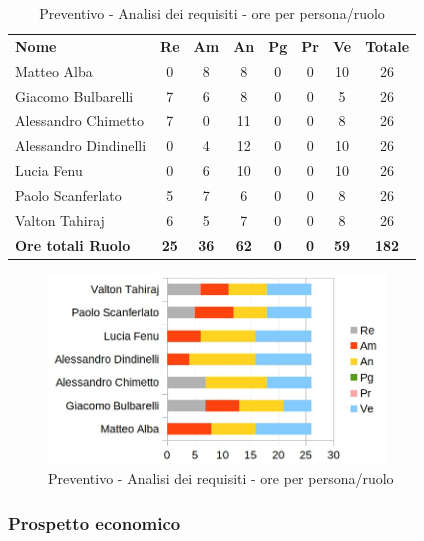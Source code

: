 		\begin{table} [h!]
			\begin{center}
				\begin{tabular} { m{3.5cm} c c c c c c c }
					\rowcolor{lightgray}
					\textbf{Nome} & \textbf{Re} & \textbf{Am} & \textbf{An} & \textbf{Pg} & \textbf{Pr} & \textbf{Ve} & \textbf{Totale} \\
					Matteo Alba &0 & 8 & 8 &0 & 0& 10 & 26\\
					Giacomo Bulbarelli & 7 & 6 & 8 & 0& 0& 5 & 26 \\
					Alessandro Chimetto & 7 &0 & 11 &0 & 0& 8 & 26 \\
					Alessandro Dindinelli &0 & 4 & 12 &0 & 0& 10 & 26 \\
					Lucia Fenu &0 & 6 & 10 &0 & 0& 10 & 26 \\
					Paolo Scanferlato & 5 & 7 & 6 & 0& 0& 8 & 26 \\
					Valton Tahiraj & 6 & 5 & 7 &0 & 0& 8 & 26 \\
					\textbf{Ore totali Ruolo} & \textbf{25} & \textbf{36} & \textbf{62} & \textbf{0} & \textbf{0}& \textbf{59} & \textbf{182}
				\end{tabular}
				\caption{Preventivo - Analisi dei requisiti - ore per persona/ruolo}
			\end{center}
		\end{table}

		\begin{figure} [h!]
			\centering
			\includegraphics[width=0.8\textwidth]{res/img/grafici/analisi_dei_requisiti_ore_ruolo.jpg}
			\caption{Preventivo - Analisi dei requisiti - ore per persona/ruolo} 
		\end{figure}

	\newpage

	\subsubsection{Prospetto economico}


